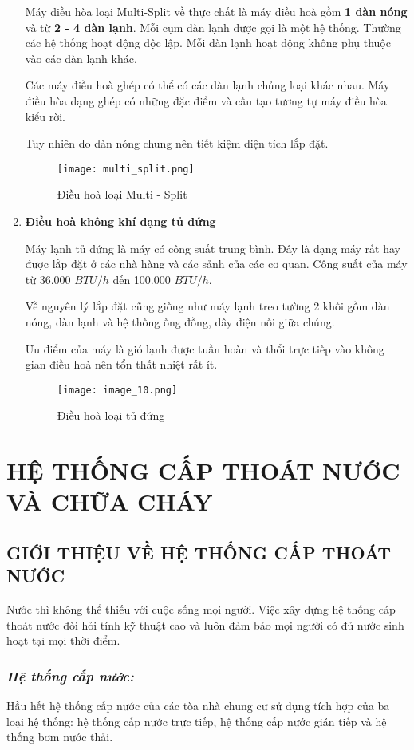 \begin{enumerate}[leftmargin=0.5cm]
		Máy điều hòa loại Multi-Split về thực chất là máy điều hoà gồm \textbf{1 dàn nóng} và từ \textbf{2 - 4 dàn lạnh}. Mỗi cụm dàn lạnh được gọi là một hệ thống. Thường các hệ thống hoạt động độc lập. Mỗi dàn lạnh hoạt động không phụ thuộc vào các dàn lạnh khác. 
		
		Các máy điều hoà ghép có thể có các dàn lạnh chủng loại khác nhau. Máy điều hòa dạng ghép có những đặc điểm và cấu tạo tương tự máy điều hòa kiểu rời.
		
		Tuy nhiên do dàn nóng chung nên tiết kiệm diện tích lắp đặt.

\begin{figure}[H]
	\centering
	\texttt{[image: multi\_split.png]}
	\caption{Điều hoà loại Multi - Split}
\end{figure}		
		
		\item \textbf{Điều hoà không khí dạng tủ đứng}
		
		Máy lạnh tủ đứng là máy có công suất trung bình. Đây là dạng máy rất hay được lắp đặt ở các nhà hàng và các sảnh của các cơ quan. Công suất của máy từ 36.000 $ BTU/h $ đến 100.000 $ BTU/h $. 
		
		Về nguyên lý lắp đặt cũng giống như máy lạnh treo tường 2 khối gồm dàn nóng, dàn lạnh và hệ thống ống đồng, dây điện nối giữa chúng. 
		
		Ưu điểm của máy là gió lạnh được tuần hoàn và thổi trực tiếp vào không gian điều hoà nên tổn thất nhiệt rất ít.
\begin{figure}[H]
	\centering
	\texttt{[image: image\_10.png]}
	\caption{Điều hoà loại tủ đứng}
\end{figure}		
	\end{enumerate}
	
	\section{HỆ THỐNG CẤP THOÁT NƯỚC VÀ CHỮA CHÁY}
	\subsection{GIỚI THIỆU VỀ HỆ THỐNG CẤP THOÁT NƯỚC}
	Nước thì không thể thiếu với cuộc sống mọi người. Việc xây dựng hệ thống cáp thoát nước đòi hỏi tính kỹ thuật cao và luôn đảm bảo mọi người có đủ nước sinh hoạt tại mọi thời điểm.
	
	\subsubsection{\emph{Hệ thống cấp nước:}}
	Hầu hết hệ thống cấp nước của các tòa nhà chung cư sử dụng tích hợp của ba loại hệ thống: hệ thống cấp nước trực tiếp, hệ thống cấp nước gián tiếp và hệ thống bơm nước thải.
		
